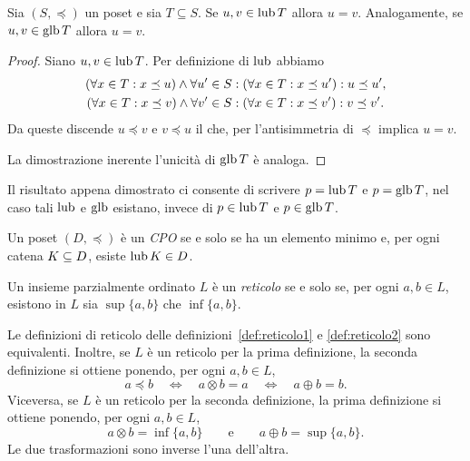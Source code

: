\begin{proposizione} 
Sia $(S, \preceq)$ un poset e sia $T \subseteq S$.
Se $u, v \in \mathop{\mathrm{lub}}\nolimits T$ allora $u = v$.
Analogamente, se $u, v \in \mathop{\mathrm{glb}}\nolimits T$ allora $u = v$.
\end{proposizione}
\begin{proof}
Siano $u, v \in \mathop{\mathrm{lub}}\nolimits T$.  Per definizione di $\mathop{\mathrm{lub}}\nolimits$ abbiamo
\begin{align*}
  (\forall x \in T \mathrel{:} x \preceq u)
    \land
      \forall u' \in S
        &\mathrel{:} (\forall x \in T \mathrel{:} x \preceq u') \mathrel{:} u \preceq u', \\
  (\forall x \in T \mathrel{:} x \preceq v)
    \land
      \forall v' \in S
        &\mathrel{:} (\forall x \in T \mathrel{:} x \preceq v') \mathrel{:} v \preceq v'.
\end{align*}
Da queste discende $u \preceq v$ e $v \preceq u$ il che,
per l'antisimmetria di $\preceq$ implica $u = v$.

La dimostrazione inerente l'unicità di $\mathop{\mathrm{glb}}\nolimits T$ è analoga.
\end{proof}

Il risultato appena dimostrato ci consente di scrivere $p = \mathop{\mathrm{lub}}\nolimits T$ e
$p = \mathop{\mathrm{glb}}\nolimits T$, nel caso tali $\mathop{\mathrm{lub}}\nolimits$ e $\mathop{\mathrm{glb}}\nolimits$ esistano,
invece di $p \in \mathop{\mathrm{lub}}\nolimits T$ e $p \in \mathop{\mathrm{glb}}\nolimits T$.

\begin{definizione} 
\label{def:cpo}
Un poset $(D, \preceq)$ \`e un \emph{CPO} se e solo se
ha un elemento minimo e, per ogni catena $K \subseteq D$, esiste $\mathop{\mathrm{lub}}\nolimits K \in D$.
\end{definizione}

\begin{definizione}  
\label{def:reticolo2}
Un insieme parzialmente ordinato $L$ \`e un \emph{reticolo} se e solo se,
per ogni $a, b \in L$, esistono in $L$ sia $\sup\{a,b\}$ che $\inf\{a,b\}$.
\end{definizione}

\begin{proposizione}
\textup{\cite{BurrisS81}} Le definizioni di reticolo
delle definizioni~\textup{\ref{def:reticolo1}} e \textup{\ref{def:reticolo2}}
sono equivalenti.
Inoltre, se $L$ \`e
un reticolo per la prima definizione, la seconda definizione si ottiene
ponendo, per ogni $a,b \in L$,
\[
    a \preceq b \quad\iff\quad a \otimes b = a \quad\iff\quad a \oplus b = b.
\]
Viceversa, se $L$ \`e un reticolo per la seconda definizione,
la prima definizione si ottiene ponendo, per ogni $a,b \in L$,
\[
    a \otimes b = \inf\{a,b\} \qquad\mbox{e}\qquad a \oplus b = \sup\{a,b\}.
\]
Le due trasformazioni sono inverse l'una dell'altra.
\end{proposizione}

